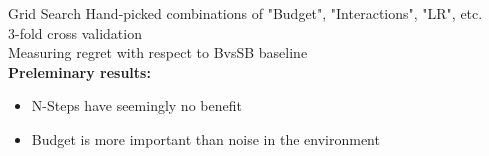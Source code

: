 \documentclass[aspectratio=169, 11pt, invertlogo]{ismll-slides}
\begin{document}


\begin{frame}[fragile]{Grid Search}
	Hand-picked combinations of "Budget", "Interactions", "LR", etc. \\ [1mm]
	3-fold cross validation \\ [1mm]
	Measuring regret with respect to BvsSB baseline \\ [1mm]
	\textbf{Preleminary results:}
	\begin{itemize}
		\item N-Steps have seemingly no benefit
		\item Budget is more important than noise in the environment
	\end{itemize}
\end{frame}


\appendix


%
%




\begin{frame}[allowframebreaks]%
%
%
\end{frame}

\end{document}

